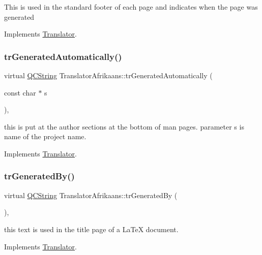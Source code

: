 This is used in the standard footer of each page and indicates when the page was generated 

Implements \mbox{\hyperlink{class_translator}{Translator}}.

\mbox{\label{class_translator_afrikaans_a09837fbad5e555b93ede26e505a8c646}} 
\subsubsection{\texorpdfstring{trGeneratedAutomatically()}{trGeneratedAutomatically()}}
{\footnotesize\ttfamily virtual \mbox{\hyperlink{class_q_c_string}{Q\+C\+String}} Translator\+Afrikaans\+::tr\+Generated\+Automatically (\begin{DoxyParamCaption}\item[{const char $\ast$}]{s }\end{DoxyParamCaption})\hspace{0.3cm}{\ttfamily [inline]}, {\ttfamily [virtual]}}

this is put at the author sections at the bottom of man pages. parameter s is name of the project name. 

Implements \mbox{\hyperlink{class_translator}{Translator}}.

\mbox{\label{class_translator_afrikaans_a13d3719db80d6ff7ba07628ac88df9ab}} 
\subsubsection{\texorpdfstring{trGeneratedBy()}{trGeneratedBy()}}
{\footnotesize\ttfamily virtual \mbox{\hyperlink{class_q_c_string}{Q\+C\+String}} Translator\+Afrikaans\+::tr\+Generated\+By (\begin{DoxyParamCaption}{ }\end{DoxyParamCaption})\hspace{0.3cm}{\ttfamily [inline]}, {\ttfamily [virtual]}}

this text is used in the title page of a La\+TeX document. 

Implements \mbox{\hyperlink{class_translator}{Translator}}.

